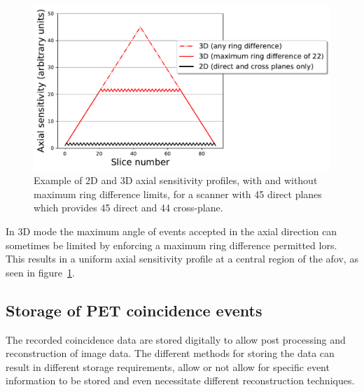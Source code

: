 \begin{figure} [h!]
\centering
\includegraphics[scale=0.50,angle=0]{2_Theory_Methods/figures/2_2_2D3DSensitivityProfiles.pdf}
\caption{Example of 2D and 3D axial sensitivity profiles, with and without maximum ring difference limits, for a scanner with 45 direct planes which provides 45 direct and 44 cross-plane.} 
\label{fig_2:2D3DSensitivityProfiles}
\end{figure} 
%
%
In 3D mode the maximum angle of events accepted in the axial direction can sometimes be limited by enforcing a maximum ring difference permitted \glspl{lor}. This results in a uniform axial sensitivity profile at a central region of the \gls{afov}, as seen in figure~\ref{fig_2:2D3DSensitivityProfiles}.
%
%
\subsection{Storage of PET coincidence events}
The recorded coincidence data are stored digitally to allow post processing and reconstruction of image data.
The different methods for storing the data can result in different storage requirements, allow or not allow for specific event information to be stored and even necessitate different reconstruction techniques. 

